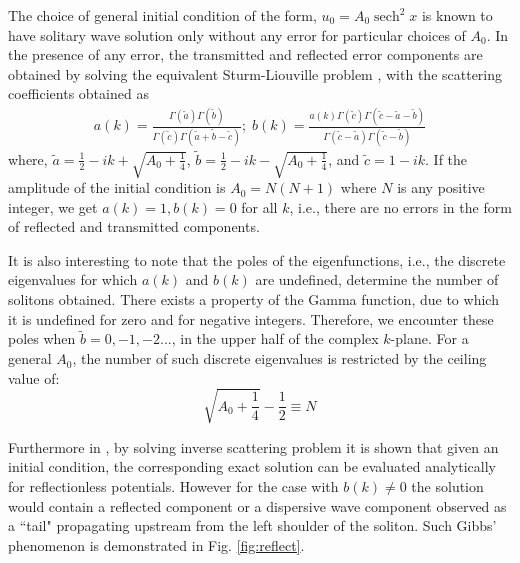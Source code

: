 \documentclass{svjour3}                    %
\DeclareMathOperator{\sech}{sech}
\begin{document}
The choice of general initial condition of the form, $u_0 = A_0 \sech^2{x}$ is known to have solitary wave solution only without any error for particular choices of $A_0$. In the presence of any error, the transmitted and reflected error components are obtained by solving the equivalent Sturm-Liouville problem \cite[pp. 42-48]{Drazin1989}, with the scattering coefficients obtained as
\begin{align*}
a(k) = \frac{ \Gamma(\tilde{a})\Gamma(\tilde{b}) }{ \Gamma(\tilde{c})\Gamma(\tilde{a}+ \tilde{b} -\tilde{c}) };  \; 
b(k) =\frac{  a(k) \Gamma(\tilde{c})\Gamma(\tilde{c}- \tilde{a} -\tilde{b}) } { \Gamma(\tilde{c} -\tilde{a})\Gamma(\tilde{c} - \tilde{b}) }
\end{align*}
where, $\tilde{a} = \frac{1}{2} - ik + \sqrt{A_0 + \frac{1}{4}}$, $\tilde{b} = \frac{1}{2} - ik - \sqrt{A_0 + \frac{1}{4}}$, and $\tilde{c} = 1 - ik$. If the amplitude of the initial condition is $A_0= N(N+1)$ where $N$ is any positive integer, we get $a(k)=1, b(k)=0$ for all $k$, i.e., there are no errors in the form of reflected and transmitted components.

It is also interesting to note that the poles of the eigenfunctions, i.e., the discrete eigenvalues for which $a(k)$ and $b(k)$ are undefined, determine the number of solitons obtained. There exists a property of the Gamma function, due to which it is undefined for zero and for negative integers. 
Therefore, we encounter these poles when $\tilde{b}=0,-1,-2...$, in the upper half of the complex $k$-plane. For a general $A_0$, the number of such discrete eigenvalues is restricted by the ceiling value of:
\begin{equation}
\label{eq:ao_n_relation}
\sqrt{A_0 + \frac{1}{4}} - \frac{1}{2} \equiv N
\end{equation}

Furthermore in \cite{Gardner1967}, by solving inverse scattering problem it is shown that given an initial condition, the corresponding exact solution 
can be evaluated analytically for reflectionless potentials. However for the case with $b(k)\neq 0$ the solution would contain a reflected component or 
a dispersive wave component observed as a ``tail" propagating upstream from the left shoulder of the soliton. Such Gibbs' phenomenon is demonstrated in Fig. \ref{fig:reflect}.
\end{document}
